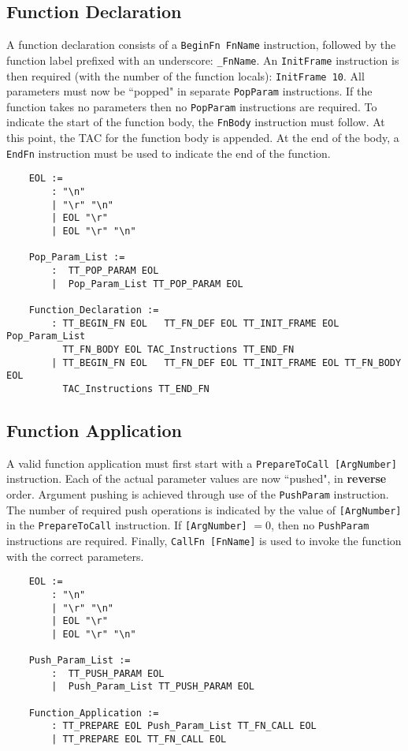 \subsection{Function Declaration}
\label{sec:funcdec}
A function declaration consists of a \verb!BeginFn FnName! instruction, followed by the function label prefixed with an underscore: \verb!_FnName!. An \verb!InitFrame! instruction is then required (with the number of the function locals): \verb!InitFrame 10!. All parameters must now be ``popped" in separate \verb!PopParam! instructions. If the function takes no parameters then no \verb!PopParam! instructions are required. To indicate the start of the function body, the \verb!FnBody! instruction must follow. At this point, the TAC for the function body is appended. At the end of the body, a \verb!EndFn! instruction must be used to indicate the end of the function.

\begin{verbatim}
	EOL :=
	    : "\n"
	    | "\r" "\n"
	    | EOL "\r"
	    | EOL "\r" "\n"
	
	Pop_Param_List :=
	    :  TT_POP_PARAM EOL
	    |  Pop_Param_List TT_POP_PARAM EOL
	
	Function_Declaration :=
	    : TT_BEGIN_FN EOL	TT_FN_DEF EOL TT_INIT_FRAME EOL Pop_Param_List
	      TT_FN_BODY EOL TAC_Instructions TT_END_FN
	    | TT_BEGIN_FN EOL	TT_FN_DEF EOL TT_INIT_FRAME EOL TT_FN_BODY EOL 
	      TAC_Instructions TT_END_FN
\end{verbatim}

\subsection{Function Application}
A valid function application must first start with a \verb!PrepareToCall [ArgNumber]! instruction. Each of the actual parameter values are now ``pushed", in \textbf{reverse} order. Argument pushing is achieved through use of the \verb!PushParam! instruction. The number of required push operations is indicated by the value of \verb![ArgNumber]! in the \verb!PrepareToCall! instruction. If \verb![ArgNumber]! $ = 0$, then no \verb!PushParam! instructions are required. Finally, \verb!CallFn [FnName]! is used to invoke the function with the correct parameters.

\begin{verbatim}
	EOL :=
	    : "\n"
	    | "\r" "\n"
	    | EOL "\r"
	    | EOL "\r" "\n"
	
	Push_Param_List :=
	    :  TT_PUSH_PARAM EOL
	    |  Push_Param_List TT_PUSH_PARAM EOL
	
	Function_Application :=
	    : TT_PREPARE EOL Push_Param_List TT_FN_CALL EOL
	    | TT_PREPARE EOL TT_FN_CALL EOL
\end{verbatim}

